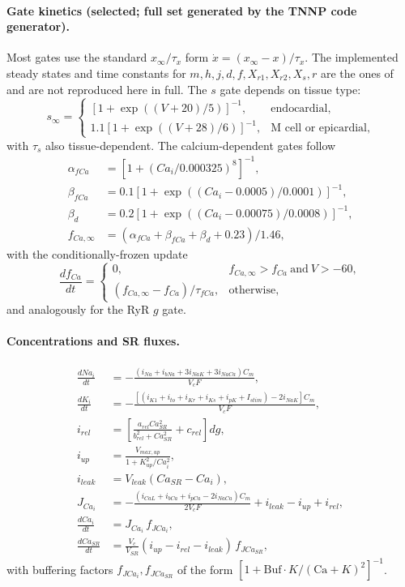 \documentclass[11pt,a4paper]{article}
\begin{document}
\paragraph{Gate kinetics (selected; full set generated by the
TNNP code generator).}
Most gates use the standard $x_\infty/\tau_x$ form
$\dot x = (x_\infty - x)/\tau_x$. The implemented steady states and
time constants for $m, h, j, d, f, X_{r1}, X_{r2}, X_s, r$ are the
ones of \cite{ttp2004} and are not reproduced here in full. The
$s$ gate depends on tissue type:
\begin{equation}
  s_\infty =
  \begin{cases}
  \left[1+\exp((V+20)/5)\right]^{-1},
  & \text{endocardial},\\
  1.1\left[1+\exp((V+28)/6)\right]^{-1},
  & \text{M cell or epicardial},
  \end{cases}
\end{equation}
with $\tau_s$ also tissue-dependent. The calcium-dependent gates
follow
\begin{align}
  \alpha_{fCa} &= [1+(Ca_i/0.000325)^{8}]^{-1},\\
  \beta_{fCa} &= 0.1[1+\exp((Ca_i-0.0005)/0.0001)]^{-1},\\
  \beta_d &= 0.2[1+\exp((Ca_i-0.00075)/0.0008)]^{-1},\\
  f_{Ca,\infty} &= (\alpha_{fCa}+\beta_{fCa}+\beta_d+0.23)/1.46,
\end{align}
with the conditionally-frozen update
\begin{equation}
  \frac{df_{Ca}}{dt}
  =
  \begin{cases}
  0, & f_{Ca,\infty}>f_{Ca}\ \text{and}\ V>-60,\\
  (f_{Ca,\infty}-f_{Ca})/\tau_{fCa}, & \text{otherwise},
  \end{cases}
\end{equation}
and analogously for the RyR $g$ gate.

\paragraph{Concentrations and SR fluxes.}
\begin{align}
  \frac{dNa_i}{dt} &=
   -\frac{(i_{Na}+i_{bNa}+3i_{NaK}+3i_{NaCa})C_m}{V_cF},\\
  \frac{dK_i}{dt} &=
   -\frac{[(i_{K1}+i_{to}+i_{Kr}+i_{Ks}+i_{pK}+I_{stim})
   -2i_{NaK}]C_m}{V_cF},\\
  i_{rel} &=
   \left[\frac{a_{rel}Ca_{SR}^{2}}{b_{rel}^{2}+Ca_{SR}^{2}}+c_{rel}\right]dg,\\
  i_{up} &= \frac{V_{max,up}}{1+K_{up}^{2}/Ca_i^{2}},\\
  i_{leak} &= V_{leak}(Ca_{SR}-Ca_i),\\
  J_{Ca_i} &=
   -\frac{(i_{CaL}+i_{bCa}+i_{pCa}-2i_{NaCa})C_m}{2V_cF}
   + i_{leak} - i_{up} + i_{rel},\\
  \frac{dCa_i}{dt}    &= J_{Ca_i}\,f_{J Ca_i},\\
  \frac{dCa_{SR}}{dt} &= \frac{V_c}{V_{SR}}(i_{up}-i_{rel}-i_{leak})\,f_{J Ca_{SR}},
\end{align}
with buffering factors $f_{J Ca_i}, f_{J Ca_{SR}}$ of the form
$[1+\text{Buf}\cdot K/(\text{Ca}+K)^{2}]^{-1}$.
\end{document}
